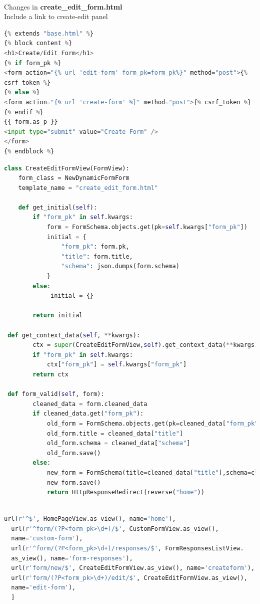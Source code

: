 \paragraph{}Changes in \textbf{create\_edit\_form.html}\\
Include a link to create-edit panel
\begin{lstlisting}[language=python,numbers=none]
{% extends "base.html" %}
{% block content %}
<h1>Create/Edit Form</h1>
{% if form_pk %}
<form action="{% url 'edit-form' form_pk=form_pk%}" method="post">{%
csrf_token %}
{% else %}
<form action="{% url 'create-form' %}" method="post">{% csrf_token %}
{% endif %}
{{ form.as_p }}
<input type="submit" value="Create Form" />
</form>
{% endblock %}
\end{lstlisting}

\begin{lstlisting}[language=python,numbers=none]
 class CreateEditFormView(FormView):
 	form_class = NewDynamicFormForm
 	template_name = "create_edit_form.html"
 
 	def get_initial(self):
 		if "form_pk" in self.kwargs:
 			form = FormSchema.objects.get(pk=self.kwargs["form_pk"])
 			initial = {
 				"form_pk": form.pk,
 				"title": form.title,
 				"schema": json.dumps(form.schema)
 			}
 		else:
			 initial = {}
 
 		return initial
 
 def get_context_data(self, **kwargs):
 		ctx = super(CreateEditFormView,self).get_context_data(**kwargs)
 		if "form_pk" in self.kwargs:
 			ctx["form_pk"] = self.kwargs["form_pk"]
 		return ctx
 
 def form_valid(self, form):
 		cleaned_data = form.cleaned_data
 		if cleaned_data.get("form_pk"):
 			old_form = FormSchema.objects.get(pk=cleaned_data["form_pk"])
 			old_form.title = cleaned_data["title"]
 			old_form.schema = cleaned_data["schema"]
 			old_form.save()
 		else:
 			new_form = FormSchema(title=cleaned_data["title"],schema=cleaned_data["schema"])
 			new_form.save()
 			return HttpResponseRedirect(reverse("home"))
 
\end{lstlisting}

\begin{lstlisting}[language=python,numbers=none]
  url(r'^$', HomePageView.as_view(), name='home'),
  url(r'^form/(?P<form_pk>\d+)/$', CustomFormView.as_view(),
  name='custom-form'),
  url(r'^form/(?P<form_pk>\d+)/responses/$', FormResponsesListView.
  as_view(), name='form-responses'),
  url(r'form/new/$', CreateEditFormView.as_view(), name='createform'),
  url(r'form/(?P<form_pk>\d+)/edit/$', CreateEditFormView.as_view(),
  name='edit-form'),
  ]
\end{lstlisting}

